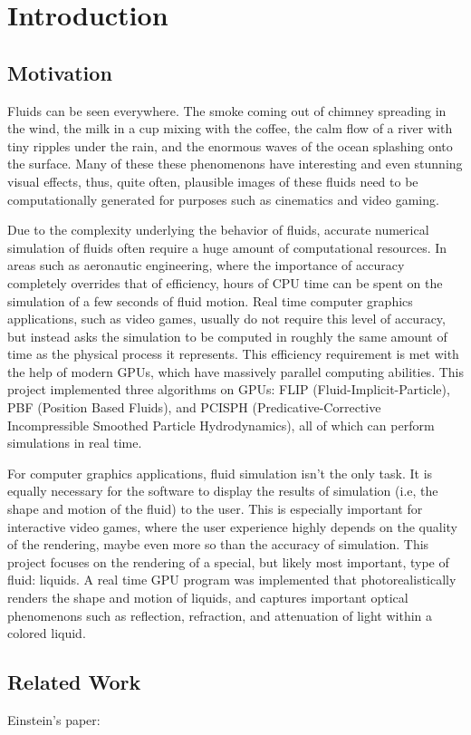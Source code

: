 \chapter{Introduction}

\section{Motivation}
Fluids can be seen everywhere. The smoke coming out of chimney spreading in the wind, the milk in a cup mixing with the coffee, the calm flow of a river with tiny ripples under the rain, and the enormous waves of the ocean splashing onto the surface. Many of these these phenomenons have interesting and even stunning visual effects, thus, quite often, plausible images of these fluids need to be computationally generated for purposes such as cinematics and video gaming. 

Due to the complexity underlying the behavior of fluids, accurate numerical simulation of fluids often require a huge amount of computational resources. In areas such as aeronautic engineering, where the importance of accuracy completely overrides that of efficiency, hours of CPU time can be spent on the simulation of a few seconds of fluid motion. Real time computer graphics applications, such as video games, usually do not require this level of accuracy, but instead asks the simulation to be computed in roughly the same amount of time as the physical process it represents. This efficiency requirement is met with the help of modern GPUs, which have massively parallel computing abilities. This project implemented three algorithms on GPUs: FLIP (Fluid-Implicit-Particle), PBF (Position Based Fluids), and PCISPH (Predicative-Corrective Incompressible Smoothed Particle Hydrodynamics), all of which can perform simulations in real time.

For computer graphics applications, fluid simulation isn't the only task. It is equally necessary for the software to display the results of simulation (i.e, the shape and motion of the fluid) to the user. This is especially important for interactive video games, where the user experience highly depends on the quality of the rendering, maybe even more so than the accuracy of simulation. This project focuses on the rendering of a special, but likely most important, type of fluid: liquids. A real time GPU program was implemented that photorealistically renders the shape and motion of liquids, and captures important optical phenomenons such as reflection, refraction, and attenuation of light within a colored liquid.

\section{Related Work}


Einstein's paper: \cite{Einstein}
